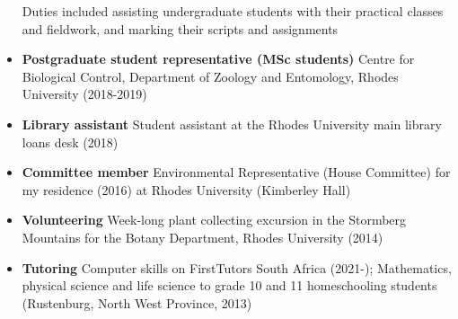 \documentclass{article}
\begin{document}
\begin{itemize}
Duties included assisting undergraduate students with their practical classes and fieldwork, and marking their scripts and assignments
\item \textbf{Postgraduate student representative (MSc students)}
Centre for Biological Control, Department of Zoology and Entomology, Rhodes University (2018-2019)
\item \textbf{Library assistant}
Student assistant at the Rhodes University main library loans desk (2018)
\item \textbf{Committee member} Environmental Representative (House Committee) for my residence (2016) at Rhodes University (Kimberley Hall)
\item \textbf{Volunteering} Week-long plant collecting excursion in the Stormberg Mountains for the Botany Department, Rhodes University (2014)
\item \textbf{Tutoring} Computer skills on FirstTutors South Africa (2021-);
Mathematics, physical science and life science to grade 10 and 11 homeschooling students (Rustenburg, North West Province, 2013)  
\end{itemize}
\end{document}
